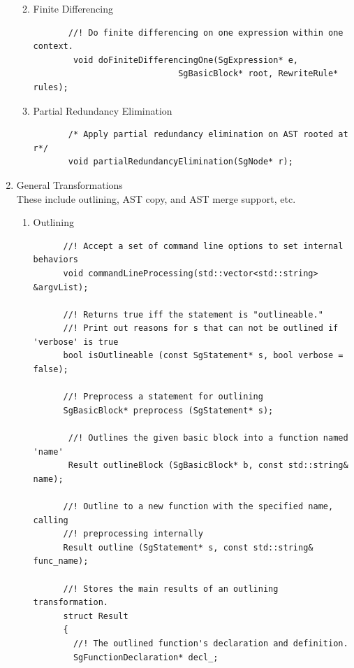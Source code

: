 \begin{enumerate}
\begin{enumerate}
\begin{lstlisting}
       \end{lstlisting}
      \item Finite Differencing  
       \begin{lstlisting}
       //! Do finite differencing on one expression within one context.
        void doFiniteDifferencingOne(SgExpression* e,
                             SgBasicBlock* root, RewriteRule* rules);
       \end{lstlisting}

      \item Partial Redundancy Elimination
       \begin{lstlisting}
       /* Apply partial redundancy elimination on AST rooted at r*/
       void partialRedundancyElimination(SgNode* r);
       \end{lstlisting}

   \end{enumerate} %

   \item General Transformations \\
         These include outlining, AST copy, and AST merge support, etc.
   \begin{enumerate}
      \item Outlining  
      \begin{lstlisting}
      //! Accept a set of command line options to set internal behaviors
      void commandLineProcessing(std::vector<std::string> &argvList);

      //! Returns true iff the statement is "outlineable."
      //! Print out reasons for s that can not be outlined if 'verbose' is true
      bool isOutlineable (const SgStatement* s, bool verbose = false);

      //! Preprocess a statement for outlining
      SgBasicBlock* preprocess (SgStatement* s);

       //! Outlines the given basic block into a function named 'name'
       Result outlineBlock (SgBasicBlock* b, const std::string& name);

      //! Outline to a new function with the specified name, calling 
      //! preprocessing internally
      Result outline (SgStatement* s, const std::string& func_name);

      //! Stores the main results of an outlining transformation.
      struct Result
      {
        //! The outlined function's declaration and definition.
        SgFunctionDeclaration* decl_;
      

\end{lstlisting}
\end{enumerate}
\end{enumerate}
